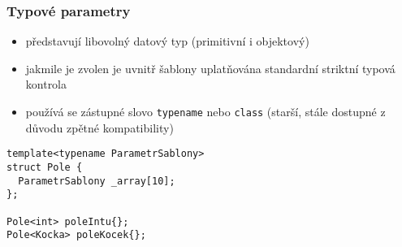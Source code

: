 \begin{frame}[fragile]
\frametitle{Typové parametry}
\begin{block}{}
\begin{itemize}
\item představují libovolný datový typ (primitivní i objektový)
\item jakmile je zvolen je uvnitř šablony uplatňována standardní striktní typová kontrola
\item používá se zástupné slovo \lstinline|typename| nebo \lstinline|class| (starší, stále dostupné z důvodu zpětné kompatibility)
\end{itemize}
\end{block}

\begin{yesblock}
\begin{lstlisting}
template<typename ParametrSablony> 
struct Pole {
  ParametrSablony _array[10];
};

Pole<int> poleIntu{};
Pole<Kocka> poleKocek{};
\end{lstlisting}
\end{yesblock}
\end{frame}









